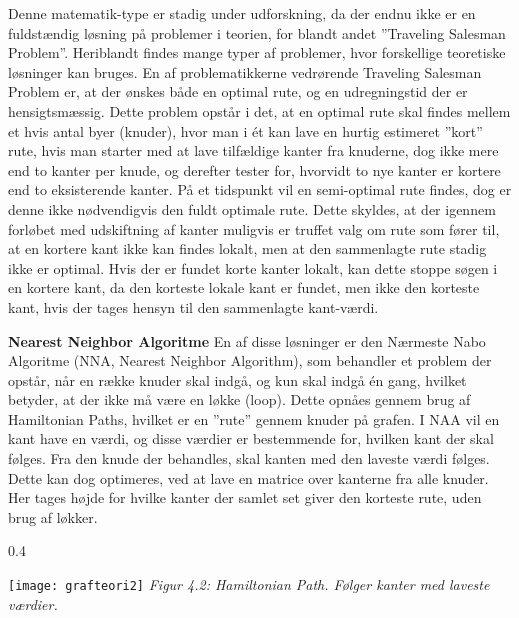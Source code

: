 Denne matematik-type er stadig under udforskning, da der endnu ikke er en fuldstændig løsning på problemer i teorien, for blandt andet ”Traveling Salesman Problem”. Heriblandt findes mange typer af problemer, hvor forskellige teoretiske løsninger kan bruges. 
En af problematikkerne vedrørende Traveling Salesman Problem er, at der ønskes både en optimal rute, og en udregningstid der er hensigtsmæssig. Dette problem opstår i det, at en optimal rute skal findes mellem et hvis antal byer (knuder), hvor man i ét kan lave en hurtig estimeret ”kort” rute, hvis man starter med at lave tilfældige kanter fra knuderne, dog ikke mere end to kanter per knude, og derefter tester for, hvorvidt to nye kanter er kortere end to eksisterende kanter. På et tidspunkt vil en semi-optimal rute findes, dog er denne ikke nødvendigvis den fuldt optimale rute. Dette skyldes, at der igennem forløbet med udskiftning af kanter muligvis er truffet valg om rute som fører til, at en kortere kant ikke kan findes lokalt, men at den sammenlagte rute stadig ikke er optimal. Hvis der er fundet korte kanter lokalt, kan dette stoppe søgen i en kortere kant, da den korteste lokale kant er fundet, men ikke den korteste kant, hvis der tages hensyn til den sammenlagte kant-værdi. \citep{TSP}
\newline

\textbf{Nearest Neighbor Algoritme}\newline
En af disse løsninger er den Nærmeste Nabo Algoritme (NNA, Nearest Neighbor Algorithm), som behandler et problem der opstår, når en række knuder skal indgå, og kun skal indgå én gang, hvilket betyder, at der ikke må være en løkke (loop). Dette opnåes gennem brug af Hamiltonian Paths, hvilket er en ”rute” gennem knuder på grafen. I NAA vil en kant have en værdi, og disse værdier er bestemmende for, hvilken kant der skal følges. Fra den knude der behandles, skal kanten med den laveste værdi følges. Dette kan dog optimeres, ved at lave en matrice over kanterne fra alle knuder. Her tages højde for hvilke kanter der samlet set giver den korteste rute, uden brug af løkker. \citep{NNA}
\newline

 
\begin{wrapfigure}{}{0.4\textwidth}
  \vspace{-40pt}
  \begin{center}
    \texttt{[image: grafteori2]} \newline
    \textit{ Figur 4.2: Hamiltonian Path. \newline Følger kanter med laveste værdier.}
  \end{center}
  \vspace{-10pt}
\end{wrapfigure}

